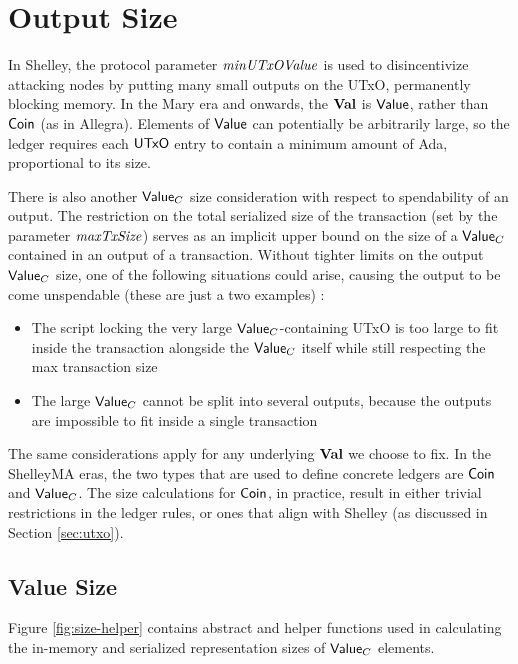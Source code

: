\section{Output Size}
\label{sec:value-size}

In Shelley, the protocol parameter $\mathit{minUTxOValue}$ is used to
disincentivize attacking nodes by putting many small outputs on the
UTxO, permanently blocking memory. In the Mary era
and onwards, the $\mathbf{Val}$ is $\mathsf{Value}$, rather than $\mathsf{Coin}$ (as in Allegra). Elements of $\mathsf{Value}$
can potentially be arbitrarily large, so the ledger requires each $\mathsf{UTxO}$ entry to
contain a minimum amount of Ada, proportional to its size.

There is also another $\mathsf{Value}_C$ size consideration with respect to spendability
of an output. The restriction on the total serialized size of the transaction (set
by the parameter $\mathit{maxTxSize}$) serves as an implicit upper bound on the
size of a $\mathsf{Value}_C$ contained in an output of a transaction. Without tighter
limits on the output $\mathsf{Value}_C$ size, one of the following situations could arise,
causing the output to be come unspendable (these are just a two examples) :

\begin{itemize}
  \item The script locking the very large $\mathsf{Value}_C$-containing UTxO is too large
  to fit inside the transaction alongside the $\mathsf{Value}_C$ itself while still respecting
  the max transaction size
  \item The large $\mathsf{Value}_C$ cannot be split into several outputs, because the
  outputs are impossible to fit inside a single transaction
\end{itemize}

The same considerations apply for any underlying $\mathbf{Val}$ we choose to fix.
In the ShelleyMA eras, the two types that are used to define concrete ledgers are $\mathsf{Coin}$ and $\mathsf{Value}_C$.
The size calculations for $\mathsf{Coin}$, in practice,
result in either trivial restrictions in the ledger rules,
or ones that align with Shelley (as discussed in Section \ref{sec:utxo}).

\subsection{Value Size}

Figure \ref{fig:size-helper} contains abstract and helper functions
used in calculating the in-memory and serialized representation
sizes of $\mathsf{Value}_C$ elements.

